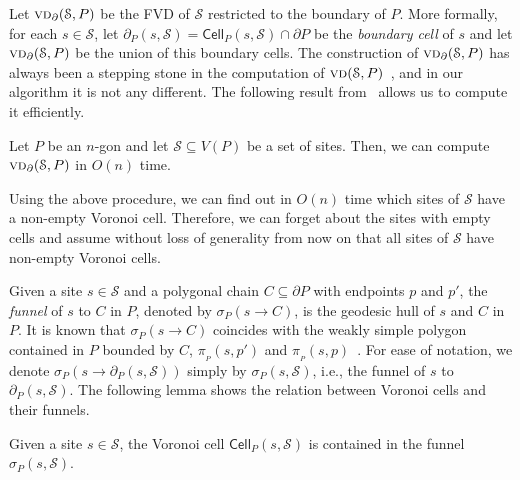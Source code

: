 \documentclass[a4paper,UKenglish]{socg-lipics-v2018}
\newcommand{\s}{\mathcal S}
\newcommand{\p}[3][P]{\ensuremath{\pi_{_{#1}}(#2, #3)}}
\newcommand{\funnel}[2][P]{\ensuremath{\sigma_{\scriptscriptstyle #1}(#2)}}
\newcommand{\cell}[2][P]{\ensuremath{\mathsf{Cell}_{\scriptscriptstyle #1}(#2)}}
\newcommand{\bcell}[2][P]{\ensuremath{\partial_{\scriptscriptstyle #1}(#2)}}
\newcommand{\vd}[2][P]{\textsc{vd}(#2, #1)}
\newcommand{\bvd}[2][P]{\textsc{vd}_{\partial}(#2, #1)}
\begin{document}
Let $\bvd{\s}$ be the FVD of $\s$ restricted to the boundary of $P$. 
More formally, for each $s\in \s$, let $\bcell{s, \s} = \cell{s, \s}\cap \partial P$ be the \emph{boundary cell} of $s$ and let $\bvd{\s}$ be the union of this boundary cells. The construction of $\bvd{\s}$ has always been a stepping stone in the computation of $\vd{\s}$~\cite{aronov1993furthest,oh2016farthest}, and in our algorithm it is not any different. 
The following result from~\cite{oh2016farthest} allows us to compute it efficiently.

\begin{theorem}\label{thm:VD in boundary}
Let $P$ be an $n$-gon and let $\s\subseteq V(P)$ be a set of sites. 
Then, we can compute $\bvd{\s}$ in $O(n)$ time. 
\end{theorem}

Using the above procedure, we can find out in $O(n)$ time which sites of $\s$ have a non-empty Voronoi cell. 
Therefore, we can forget about the sites with empty cells and assume without loss of generality from now on that all sites of $\s$ have non-empty Voronoi cells.

Given a site $s\in \s$ and a polygonal chain $C \subseteq \partial P$ with endpoints $p$ and $p'$, the \emph{funnel} of $s$ to $C$ in $P$, denoted by $\funnel{s\to C}$, 
is the geodesic hull of $s$ and $C$ in $P$. It is known that $\funnel{s\to C}$ coincides with the weakly simple polygon contained in $P$ bounded by $C$, $\p{s}{p'}$ and $\p{s}{p}$~\cite{ahn2015linear}.
For ease of notation, we denote $\funnel{s \to \bcell{s, \s}}$ simply by $\funnel{s, \s}$, i.e., the funnel of $s$ to $\bcell{s, \s}$.
The following lemma shows the relation between Voronoi cells and their funnels.


\begin{lemma}\label{lemma:Voronoi cell in funnel}
Given a site $s\in \s$, the Voronoi cell $\cell{s, \s}$ is contained in the funnel $\funnel{s, \s}$.
\end{lemma}
\end{document}
